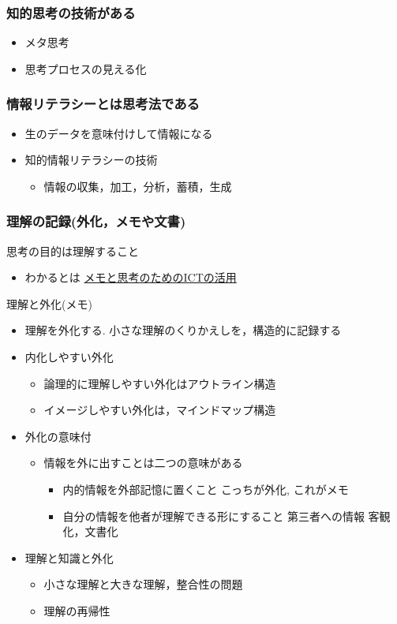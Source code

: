 \documentclass[dvipdfmx,11pat]{jarticle}
\begin{document}
\subsubsection{知的思考の技術がある}
\label{sec:org6f28320}
\begin{itemize}
\item メタ思考
\item 思考プロセスの見える化
\end{itemize}
\subsubsection{情報リテラシーとは思考法である}
\label{sec:orgb4749de}
\begin{itemize}
\item 生のデータを意味付けして情報になる
\item 知的情報リテラシーの技術
\begin{itemize}
\item 情報の収集，加工，分析，蓄積，生成
\end{itemize}
\end{itemize}
\subsubsection{理解の記録(外化，メモや文書)}
\label{sec:org8743818}
思考の目的は理解すること
\begin{itemize}
\item わかるとは \href{https://masayuki054.github.io/ict\_literacy\_for\_thinking\_and\_memo/\#outline-container-orgeb1c772}{メモと思考のためのICTの活用}
\end{itemize}

理解と外化(メモ)  
\begin{itemize}
\item 理解を外化する. 小さな理解のくりかえしを，構造的に記録する
\item 内化しやすい外化
\begin{itemize}
\item 論理的に理解しやすい外化はアウトライン構造
\item イメージしやすい外化は，マインドマップ構造
\end{itemize}
\item 外化の意味付
\begin{itemize}
\item 情報を外に出すことは二つの意味がある
\begin{itemize}
\item 内的情報を外部記憶に置くこと
こっちが外化, これがメモ
\item 自分の情報を他者が理解できる形にすること
第三者への情報 客観化，文書化
\end{itemize}
\end{itemize}
\item 理解と知識と外化
\begin{itemize}
\item 小さな理解と大きな理解，整合性の問題
\item 理解の再帰性
\end{itemize}
\end{itemize}
\end{document}
